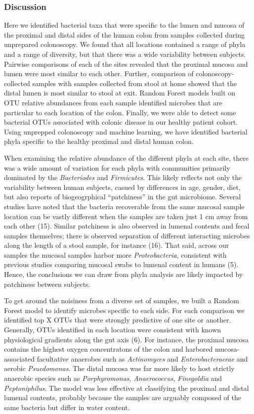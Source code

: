 \documentclass[11pt,]{article}
\begin{document}
\subsubsection{Discussion}\label{discussion}

Here we identified bacterial taxa that were specific to the lumen and
mucosa of the proximal and distal sides of the human colon from samples
collected during unprepared colonoscopy. We found that all locations
contained a range of phyla and a range of diversity, but that there was
a wide variability between subjects. Pairwise comparisons of each of the
sites revealed that the proximal mucosa and lumen were most similar to
each other. Further, comparison of colonoscopy-collected samples with
samples collected from stool at home showed that the distal lumen is
most similar to stool at exit. Random Forest models built on OTU
relative abundances from each sample identified microbes that are
particular to each location of the colon. Finally, we were able to
detect some bacterial OTUs associated with colonic disease in our
healthy patient cohort. Using unprepped colonoscopy and machine
learning, we have identified bacterial phyla specific to the healthy
proximal and distal human colon.

When examining the relative abundance of the different phyla at each
site, there was a wide amount of variation for each phyla with
communities primarily dominated by the \emph{Bacteriodes} and
\emph{Firmicutes}. This likely reflects not only the variability between
human subjects, casued by differences in age, gender, diet, but also
reports of biogeogrphical ``patchiness'' in the gut microbiome. Several
studies have noted that the bacteria recoverable from the same mucosal
sample location can be vastly different when the samples are taken just
1 cm away from each other (15). Similar patchiness is also observed in
lumenal contents and fecal samples themselves; there is observed
separation of different interacting microbes along the length of a stool
sample, for instance (16). That said, across our samples the mucosal
samples harbor more \emph{Proteobacteria}, consistent with previous
studies comparing mucosal swabs to lumenal content in humans (5). Hence,
the conclusions we can draw from phyla analysis are likely impacted by
patchiness between subjects.

To get around the noisiness from a diverse set of samples, we built a
Random Forest model to identify microbes specific to each side. For each
comparison we identified top X OTUs that were strongly predictive of one
site or another. Generally, OTUs identified in each location were
consistent with known physiological gradients along the gut axis (6).
For instance, the proximal mucosa contains the highest oxygen
concentratons of the colon and harbored mucosa-associated facultative
anaerobes such as \emph{Actinomyces} and \emph{Enterobacteraceae} and
aerobic \emph{Psuedomonas}. The distal mucosa was far more likely to
host strictly anaerobic species such as \emph{Porphyromonas},
\emph{Anaerococcus}, \emph{Finegoldia} and \emph{Peptoniphilus}. The
model was less effective at classifying the proximal and distal lumenal
contents, probably because the samples are arguably composed of the same
bacteria but differ in water content.
\end{document}
